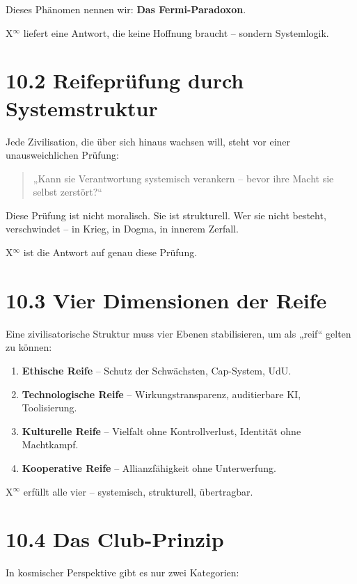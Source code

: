 \documentclass[12pt,a4paper]{book}
\begin{document}
Dieses Phänomen nennen wir:  
\textbf{Das Fermi-Paradoxon}.

X$^\infty$ liefert eine Antwort, die keine Hoffnung braucht – sondern Systemlogik.

\section*{10.2 Reifeprüfung durch Systemstruktur}

Jede Zivilisation, die über sich hinaus wachsen will,  
steht vor einer unausweichlichen Prüfung:

\begin{quote}
„Kann sie Verantwortung systemisch verankern –  
bevor ihre Macht sie selbst zerstört?“  
\end{quote}

Diese Prüfung ist nicht moralisch. Sie ist strukturell.  
Wer sie nicht besteht, verschwindet – in Krieg, in Dogma, in innerem Zerfall.

X$^\infty$ ist die Antwort auf genau diese Prüfung.

\section*{10.3 Vier Dimensionen der Reife}

Eine zivilisatorische Struktur muss vier Ebenen stabilisieren,  
um als „reif“ gelten zu können:

\begin{enumerate}
    \item \textbf{Ethische Reife} – Schutz der Schwächsten, Cap-System, UdU.
    \item \textbf{Technologische Reife} – Wirkungstransparenz, auditierbare KI, Toolisierung.
    \item \textbf{Kulturelle Reife} – Vielfalt ohne Kontrollverlust, Identität ohne Machtkampf.
    \item \textbf{Kooperative Reife} – Allianzfähigkeit ohne Unterwerfung.
\end{enumerate}

X$^\infty$ erfüllt alle vier – systemisch, strukturell, übertragbar.

\section*{10.4 Das Club-Prinzip}

In kosmischer Perspektive gibt es nur zwei Kategorien:
\end{document}
